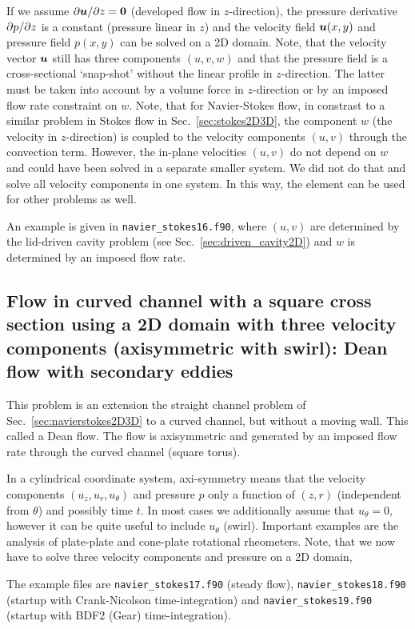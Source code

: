 If we assume $\partial \boldsymbol{u}/\partial z=\boldsymbol{0}$ (developed flow in $z$-direction), the pressure derivative $\partial p/\partial z$ is a constant (pressure linear in $z$) and the velocity field $\boldsymbol{u}(x,y)$ and pressure field $p(x,y)$ can be solved on a 2D domain. Note, that the velocity vector $\boldsymbol{u}$ still has three components $(u,v,w)$ and that the pressure field is a cross-sectional `snap-shot' without the linear profile in $z$-direction. The latter must be taken into account by a volume force in $z$-direction or by an imposed flow rate constraint on $w$. Note, that for Navier-Stokes flow, in constrast to a similar problem in Stokes flow in Sec.~\ref{sec:stokes2D3D}, the component $w$ (the velocity in $z$-direction) is coupled to the velocity components $(u,v)$ through the convection term. However, the in-plane velocities $(u,v)$ do not depend on $w$ and could have been solved in a separate smaller system. We did not do that and solve all velocity components in one system. In this way, the element can be used for other problems as well.

An example is given in \texttt{navier\_stokes16.f90}, where $(u,v)$ are determined by the lid-driven cavity problem (see Sec.~\ref{sec:driven_cavity2D}) and $w$ is determined by an imposed flow rate.

\subsection{Flow in curved channel with a square cross section using a 2D domain with 
three velocity components (axisymmetric with swirl): Dean flow with secondary eddies}
\label{sec:nsDean2D}

This problem is an extension the straight channel problem of Sec.~\ref{sec:navierstokes2D3D} to a curved channel,
but without a moving wall.
This called a Dean flow. The flow is axisymmetric and generated by an imposed flow rate through the curved channel (square torus).

In a cylindrical coordinate system, axi-symmetry means that the velocity components $(u_z,u_r,u_\theta)$ and pressure $p$ only a function of $(z,r)$ (independent from $\theta$) and possibly time $t$. In most cases we additionally assume that $u_\theta=0$, however it can be quite useful to include $u_\theta$ (swirl). Important examples are the analysis of plate-plate and cone-plate rotational rheometers. Note, that we now have to solve three velocity components and pressure on a 2D domain,
                                                                                
The example files are \texttt{navier\_stokes17.f90} (steady flow), \texttt{navier\_stokes18.f90} (startup with Crank-Nicolson time-integration) and \texttt{navier\_stokes19.f90} (startup with BDF2 (Gear) time-integration).

 

